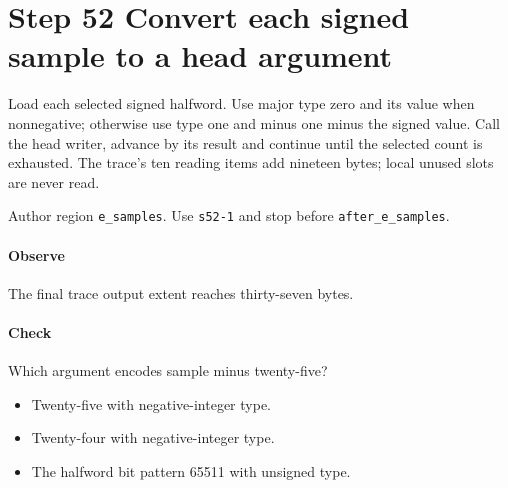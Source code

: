 \section{Step 52 Convert each signed sample to a head argument}\label{cbor-s52}
Load each selected signed halfword. Use major type zero and its value when nonnegative; otherwise use type one and minus one minus the signed value. Call the head writer, advance by its result and continue until the selected count is exhausted. The trace's ten reading items add nineteen bytes; local unused slots are never read.

Author region \texttt{e\_samples}. Use \texttt{s52-1} and stop before \texttt{after\_e\_samples}. 

\paragraph{Observe} The final trace output extent reaches thirty-seven bytes.

\paragraph{Check} Which argument encodes sample minus twenty-five?
\begin{itemize}
\item[A.] Twenty-five with negative-integer type.
\item[B.] Twenty-four with negative-integer type.
\item[C.] The halfword bit pattern 65511 with unsigned type.
\end{itemize}
